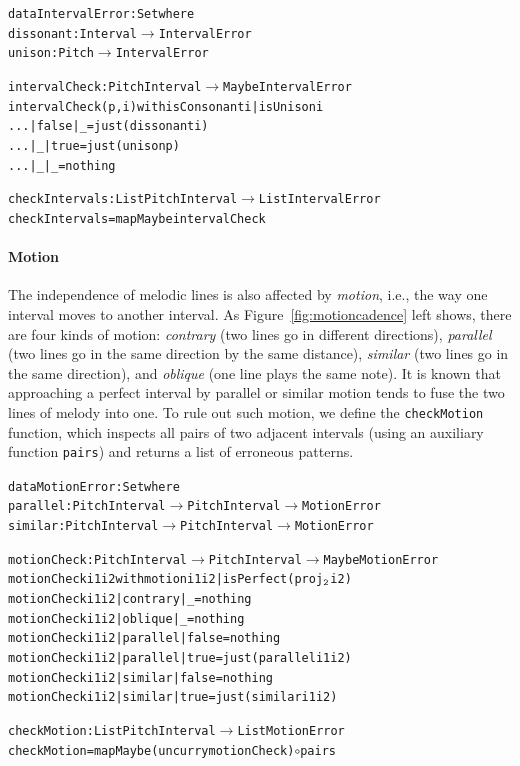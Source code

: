 \begin{alltt}
data IntervalError : Set where
  dissonant : Interval \(\rightarrow\) IntervalError
  unison    : Pitch \(\rightarrow\) IntervalError

intervalCheck : PitchInterval \(\rightarrow\) Maybe IntervalError
intervalCheck (p , i) with isConsonant i | isUnison i
... | false | _    = just (dissonant i)
... | _     | true = just (unison p)
... | _     | _    = nothing

checkIntervals : List PitchInterval \(\rightarrow\) List IntervalError
checkIntervals = mapMaybe intervalCheck
\end{alltt}

\paragraph{Motion}

\MotionCadence

The independence of melodic lines is also affected by \emph{motion},
i.e., the way one interval moves to another interval.
As Figure~\ref{fig:motioncadence} left shows, there are four kinds of motion:
\emph{contrary} (two lines go in different directions),
\emph{parallel} (two lines go in the same direction by the same
distance), \emph{similar} (two lines go in the same direction),
and \emph{oblique} (one line plays the same note).
It is known that approaching a perfect interval by parallel or similar
motion tends to fuse the two lines of melody into one.
To rule out such motion, we define the \texttt{checkMotion}
function, which inspects all pairs of two adjacent intervals (using an
auxiliary function \texttt{pairs}) and returns a list of erroneous patterns.

\begin{alltt}
data MotionError : Set where
  parallel : PitchInterval \(\rightarrow\) PitchInterval \(\rightarrow\) MotionError
  similar  : PitchInterval \(\rightarrow\) PitchInterval \(\rightarrow\) MotionError

motionCheck : PitchInterval \(\rightarrow\) PitchInterval \(\rightarrow\) Maybe MotionError
motionCheck i1 i2 with motion i1 i2 | isPerfect (proj\(\sb{\mathtt{2}}\) i2)
motionCheck i1 i2 | contrary | \_     = nothing
motionCheck i1 i2 | oblique  | \_     = nothing
motionCheck i1 i2 | parallel | false = nothing
motionCheck i1 i2 | parallel | true  = just (parallel i1 i2)
motionCheck i1 i2 | similar  | false = nothing
motionCheck i1 i2 | similar  | true  = just (similar i1 i2)

checkMotion : List PitchInterval \(\rightarrow\) List MotionError
checkMotion = mapMaybe (uncurry motionCheck) \(\circ\) pairs
\end{alltt}

